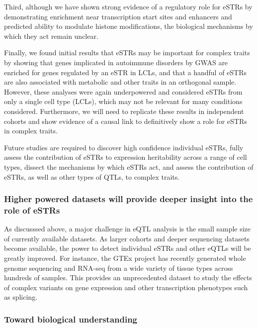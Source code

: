 Third, although we have shown strong evidence of a regulatory role for eSTRs by demonstrating enrichment near transcription start sites and enhancers and predicted ability to modulate histone modifications, the biological mechanisms by which they act remain unclear.

Finally, we found initial results that eSTRs may be important for complex traits by showing that genes implicated in autoimmune disorders by GWAS are enriched for genes regulated by an eSTR in LCLs, and that a handful of eSTRs are also associated with metabolic and other traits in an orthogonal sample. However, these analyses were again underpowered and considered eSTRs from only a single cell type (LCLs), which may not be relevant for many conditions considered. Furthermore,  we will need to replicate these results in independent cohorts and show evidence of a causal link to definitively show a role for eSTRs in complex traits.

Future studies are required to discover high confidence individual eSTRs, fully assess the contribution of eSTRs to expression heritability across a range of cell types, dissect the mechanisms by which eSTRs act, and assess the contribution of eSTRs, as well as other types of QTLs, to complex traits.

\subsubsection{Higher powered datasets will provide deeper insight into the role of eSTRs}
As discusssed above, a major challenge in eQTL analysis is the small sample size of currently available datasets. As larger cohorts and deeper sequencing datasets become available, the power to detect individual eSTRs and other eQTLs will be greatly improved. For instance, the GTEx project \cite{ArdlieDelucaSegreEtAl2015} has recently generated whole genome sequencing and RNA-seq from a wide variety of tissue types across hundreds of samples. This provides an unprecedented dataset to study the effects of complex variants on gene expression and other transcription phenotypes such as splicing. 

\subsubsection{Toward biological understanding}

